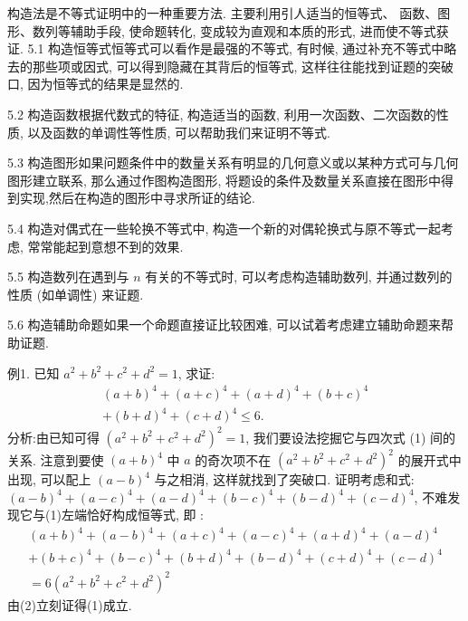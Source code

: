 
构造法是不等式证明中的一种重要方法.
主要利用引人适当的恒等式、 函数、图形、数列等辅助手段, 使命题转化, 变成较为直观和本质的形式, 进而使不等式获证.
5.1 构造恒等式恒等式可以看作是最强的不等式, 有时候, 通过补充不等式中略去的那些项或因式, 可以得到隐藏在其背后的恒等式, 这样往往能找到证题的突破口, 因为恒等式的结果是显然的.



5.2 构造函数根据代数式的特征, 构造适当的函数, 利用一次函数、二次函数的性质, 以及函数的单调性等性质, 可以帮助我们来证明不等式.



5.3 构造图形如果问题条件中的数量关系有明显的几何意义或以某种方式可与几何 图形建立联系, 那么通过作图构造图形, 将题设的条件及数量关系直接在图形中得到实现,然后在构造的图形中寻求所证的结论.



5.4 构造对偶式在一些轮换不等式中, 构造一个新的对偶轮换式与原不等式一起考虑, 常常能起到意想不到的效果.



5.5 构造数列在遇到与 $n$ 有关的不等式时, 可以考虑构造辅助数列, 并通过数列的性质 (如单调性) 来证题.



5.6 构造辅助命题如果一个命题直接证比较困难, 可以试着考虑建立辅助命题来帮助证题.



例1. 已知 $a^2+b^2+c^2+d^2=1$, 求证:
$$
\begin{gathered}
(a+b)^4+(a+c)^4+(a+d)^4+(b+c)^4 \\
+(b+d)^4+(c+d)^4 \leqslant 6 .
\end{gathered} \label{(1)}
$$
分析:由已知可得 $\left(a^2+b^2+c^2+d^2\right)^2=1$, 我们要设法挖掘它与四次式 (1) 间的关系.
注意到要使 $(a+b)^4$ 中 $a$ 的奇次项不在 $\left(a^2+b^2+c^2+d^2\right)^2$ 的展开式中出现, 可以配上 $(a-b)^4$ 与之相消, 这样就找到了突破口.
证明考虑和式: $(a-b)^4+(a-c)^4+(a-d)^4+(b-c)^4+(b-d)^4+ (c-d)^4$, 不难发现它与(1)左端恰好构成恒等式, 即 :
$$
\begin{gathered}
(a+b)^4+(a-b)^4+(a+c)^4+(a-c)^4+(a+d)^4+(a-d)^4 \\
+(b+c)^4+(b-c)^4+(b+d)^4+(b-d)^4+(c+d)^4+(c-d)^4 \\
=6\left(a^2+b^2+c^2+d^2\right)^2
\end{gathered} \label{(2)}
$$
由(2)立刻证得(1)成立.



